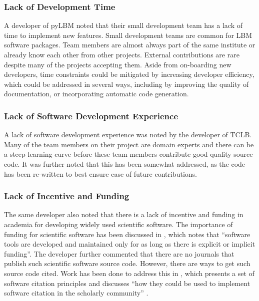 \documentclass[final, 3p, times, authoryear]{elsarticle}
\begin{document}
\subsubsection{Lack of Development Time}

A developer of pyLBM noted that their small development team has a lack of time
to implement new features. Small development teams are common for LBM software
packages. Team members are almost always part of the same institute or already
know each other from other projects. External contributions are rare despite
many of the projects accepting them. Aside from on-boarding new developers, time
constraints could be mitigated by increasing developer efficiency, which could
be addressed in several ways, including by improving the quality of
documentation, or incorporating automatic code generation.

\subsubsection{Lack of Software Development Experience}

A lack of software development experience was noted by the developer of TCLB.
Many of the team members on their project are domain experts and there can be a
steep learning curve before these team members contribute good quality source
code. It was further noted that this has been somewhat addressed, as the code
has been re-written to best ensure ease of future contributions.

\subsubsection{Lack of Incentive and Funding}

The same developer also noted that there is a lack of incentive and funding in
academia for developing widely used scientific software. The importance of
funding for scientific software has been discussed in
\cite{gewaltig2012quality}, which notes that ``software tools are developed and
maintained only for as long as there is explicit or implicit funding''. The
developer further commented that there are no journals that publish such
scientific software source code. However, there are ways to get such source code
cited. Work has been done to address this in \citep{smith2016software}, which
presents a set of software citation principles and discusses ``how they could be
used to implement software citation in the scholarly community''
\citep{katz2019software}. 
\end{document}
